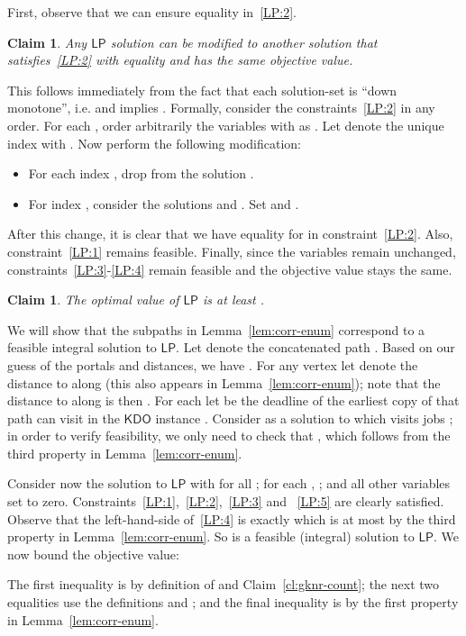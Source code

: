\documentclass[11pt,letterpaper]{article}
\newtheorem{claim}[theorem]{Claim}
\numberwithin{algorithm}{section}
\newenvironment{proof}{

\noindent{\bf Proof:}}
{\hfill


}
\newcommand{\kdo}{\ensuremath{\mathsf{KDO}}\xspace}
\newcommand{\lp}{\ensuremath{\mathsf{LP}}\xspace}
\begin{document}
First, observe that we can ensure equality in~\eqref{LP:2}.
\begin{claim}\label{cl:xy-equality}
Any \lp solution  can be modified to another solution that satisfies~\eqref{LP:2} with equality and has the same objective value.
\end{claim}
\begin{proof} This follows immediately from the fact that each solution-set  is ``down monotone'', i.e.  and  implies . Formally, consider the constraints~\eqref{LP:2} in any order. For each , order arbitrarily the  variables with  as . Let  denote the unique index with . Now perform the following modification:
\begin{itemize}
\item For each index , drop  from the solution .
\item For index , consider the solutions  and . Set  and .
\end{itemize}
After this change, it is clear that we have equality for
 in constraint~\eqref{LP:2}. Also, constraint~\eqref{LP:1} remains feasible. Finally, since the  variables remain unchanged, constraints~\eqref{LP:3}-\eqref{LP:4} remain feasible and the objective value stays the same.
\end{proof}



\begin{claim}\label{cl:LP-obj}
The optimal value of \lp is at least .
\end{claim}
\begin{proof}
We will show that the subpaths  in Lemma~\ref{lem:corr-enum} correspond to a feasible integral solution to \lp. 
Let  denote the concatenated path .
Based on our guess of the portals and distances, we have . For any vertex  let  denote the distance to  along  (this also appears in Lemma~\ref{lem:corr-enum}); note that the distance to  along  is then . For each  let  be the deadline of the earliest copy of  that path  can visit in the \kdo instance . Consider  as a solution to  which visits jobs ; in order to verify feasibility, we only need to check that , which follows from the third property in Lemma~\ref{lem:corr-enum}.

Consider now the solution to \lp with  for all ;  for each , ; and all other variables set to zero. Constraints~\eqref{LP:1},~\eqref{LP:2},~\eqref{LP:3} and ~\eqref{LP:5} are clearly satisfied. Observe that the left-hand-side of~\eqref{LP:4} is exactly  which is at most  by the third property in Lemma~\ref{lem:corr-enum}. So  is a feasible (integral) solution to \lp. We now bound the objective value:

The first inequality is by definition of  and Claim~\ref{cl:gknr-count}; the next two equalities use the definitions  and ; and the final inequality is by the first property in Lemma~\ref{lem:corr-enum}.
\end{proof}
\end{document}
